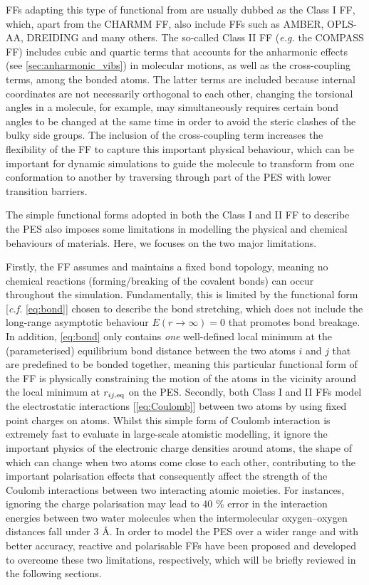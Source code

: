 FFs adapting this type of functional from are usually dubbed as the Class I FF, which, apart from the CHARMM FF, also include FFs such as AMBER,\cite{pearlman1995amber} OPLS-AA,\cite{jorgensen1996development} DREIDING\cite{mayo1990dreiding} and many others. The so-called Class II FF (\emph{e.g.} the COMPASS\cite{sun1998compass} FF) includes cubic and quartic terms that accounts for the anharmonic effects (see \cref{sec:anharmonic_vibs}) in molecular motions, as well as the cross-coupling terms, among the bonded atoms. The latter terms are included because  internal coordinates  are not necessarily orthogonal to each other, changing the torsional angles in a molecule, for example, may simultaneously requires certain bond angles to be changed at the same time in order to avoid the steric clashes of the bulky side groups. The inclusion of the cross-coupling term increases the flexibility of the FF to capture this important physical behaviour, which can be  important for dynamic simulations to guide the molecule to transform from one conformation to another by traversing through part of the PES with lower transition barriers. 

The simple functional forms adopted in both the Class I and II FF to describe the PES also imposes some limitations in modelling the physical and chemical behaviours of materials. Here, we focuses on the two major limitations.

Firstly, the FF assumes and maintains a fixed bond topology, meaning no chemical reactions (forming/breaking of the covalent bonds) can occur throughout the simulation. Fundamentally, this is limited by the functional form [\emph{c.f.} \cref{eq:bond}] chosen to describe the bond stretching, which does not include the long-range asymptotic behaviour $E(r\to\infty)=0$ that promotes bond breakage. In addition, \cref{eq:bond} only contains \emph{one} well-defined local minimum at the (parameterised) equilibrium bond distance between the two atoms $i$ and $j$ that are predefined to be bonded together, meaning this particular functional form of the FF is physically constraining the motion of the atoms in the vicinity around the local minimum at  $r_{ij,\mbox{\scriptsize{eq}}}$ on the PES. Secondly, both Class I and II FFs model the electrostatic interactions [\cref{eq:Coulomb}] between two atoms by using fixed point charges on atoms. Whilst this simple form of Coulomb interaction is extremely fast to evaluate in large-scale atomistic modelling, it ignore the important physics of the electronic charge densities around atoms, the shape of which can change when two atoms come close to each other, contributing to the important polarisation effects that consequently affect the strength of the Coulomb interactions between two interacting atomic moieties. For instances, ignoring the charge polarisation may lead to 40 \% error in the interaction energies between two water molecules when the intermolecular oxygen--oxygen distances fall under 3 $\mbox{\AA}$.\cite{ferenczy2001modeling} In order to model the PES  over a wider range and with better accuracy,  reactive and polarisable FFs have been proposed and developed to overcome these two limitations, respectively, which will be briefly reviewed in the following sections.


